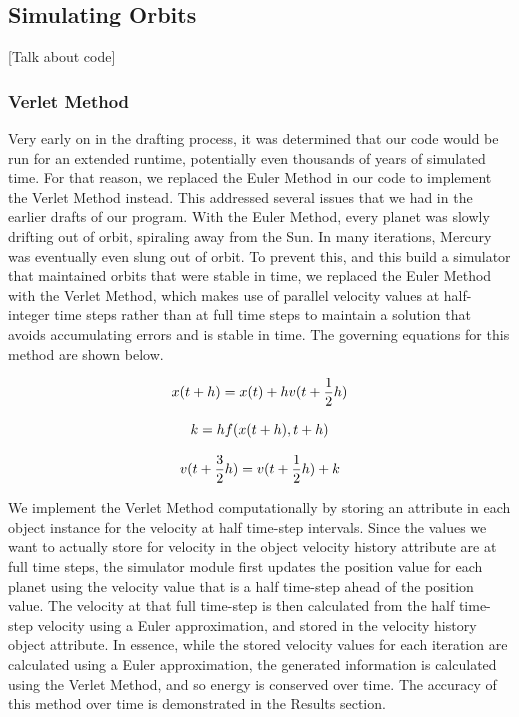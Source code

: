 \documentclass[a4paper,12pt]{article} %
\numberwithin{equation}{section} %
\numberwithin{figure}{section} %
\begin{document}
\subsection{Simulating Orbits}
[Talk about code]

\subsubsection{Verlet Method}
Very early on in the drafting process, it was determined that our code would be run for an extended runtime, potentially even thousands of years of simulated time. For that reason, we replaced the Euler Method in our code to implement the Verlet Method instead. This addressed several issues that we had in the earlier drafts of our program. With the Euler Method, every planet was slowly drifting out of orbit, spiraling away from the Sun. In many iterations, Mercury was eventually even slung out of orbit. To prevent this, and this build a simulator that maintained orbits that were stable in time, we replaced the Euler Method with the Verlet Method, which makes use of parallel velocity values at half-integer time steps rather than at full time steps to maintain a solution that avoids accumulating errors and is stable in time. The governing equations for this method are shown below.

\begin{equation}
\centering
x(t+h)=x(t)+hv(t+\frac{1}{2}h)
\end{equation}

\begin{equation}
\centering
k=hf(x(t+h),t+h)
\end{equation}

\begin{equation}
\centering
v(t+\frac{3}{2}h)=v(t+\frac{1}{2}h) + k
\end{equation}

We implement the Verlet Method computationally by storing an attribute in each object instance for the velocity at half time-step intervals. Since the values we want to actually store for velocity in the object velocity history attribute are at full time steps, the simulator module first updates the position value for each planet using the velocity value that is a half time-step ahead of the position value. The velocity at that full time-step is then calculated from the half time-step velocity using a Euler approximation, and stored in the velocity history object attribute. In essence, while the stored velocity values for each iteration are calculated using a Euler approximation, the generated information is calculated using the Verlet Method, and so energy is conserved over time. The accuracy of this method over time is demonstrated in the Results section.
\end{document}
